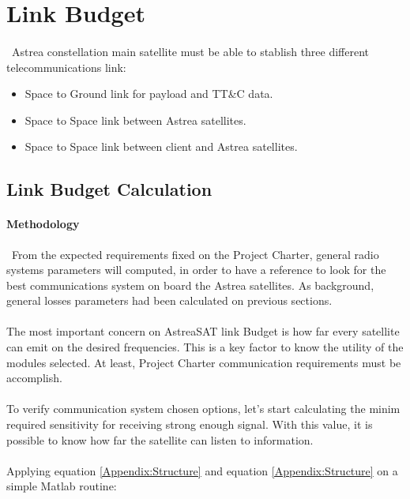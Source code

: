 \section{Link Budget}
\paragraph{}
\ Astrea constellation main satellite must be able to stablish three different telecommunications link: 
\begin{itemize}
	\item Space to Ground link for payload and TT\&C data.
	\item Space to Space link between Astrea satellites.
	\item Space to Space link between client and Astrea satellites.
\end{itemize} 


\subsection{Link Budget Calculation}
\paragraph{Methodology} \ From the expected requirements fixed on the Project Charter, general radio systems parameters will computed, in order to have a reference to look for the best communications system on board the Astrea satellites. As background, general losses parameters had been calculated on previous sections. 

\paragraph{} The most important concern on AstreaSAT link Budget is how far every satellite can emit on the desired frequencies. This is a key factor to know the utility of the modules selected. At least, Project Charter communication requirements must be accomplish.
 
\paragraph{}To verify communication system chosen options, let's start calculating the minim required sensitivity for receiving strong enough signal. With this value, it is possible to know how far the satellite can listen to information.
\paragraph{} Applying equation \ref{Appendix:Structure} and equation \ref{Appendix:Structure} on a simple Matlab routine:

